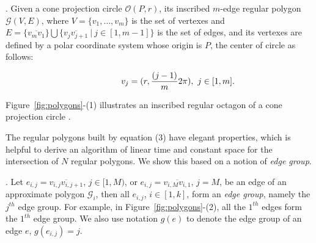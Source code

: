 .
Given a cone projection circle $\mathcal{O}(P, r)$, its inscribed $m$-edge regular polygon $\mathcal{G}(V, E)$,
where $V=\{v_1, \ldots, v_{m}\}$ is the set of vertexes and
$E= \{\overline{v_mv_1}\} \bigcup \{\overline{v_jv_{j+1}}\ |\ j\in [1, m-1]\}$ is the set of edges,
and its vertexes are defined by a polar coordinate system whose  origin is $P$, the center of circle \circle{} as follows:


\vspace{-1ex}
\begin{equation*}
\label{equ-regular-polygon}
    \begin{aligned}
        \hspace{10ex}  v_j = (r, \frac{(j-1)}{m}2\pi), ~j \in [1, m].\\
    \end{aligned}
\end{equation*}
\vspace{-1ex}


Figure~\ref{fig:polygons}-(1) illustrates an inscribed regular octagon of a cone projection  circle .

The regular polygons built by equation (3) have elegant properties, which is helpful to derive an algorithm of linear time and constant space
for the intersection of $N$ regular polygons. We show this based on a notion of \emph{edge group}.


.
Let $e_{i,j} = \overline{v_{i,j}v_{i,j+1}}$, $j\in [1,M)$, or $e_{i,j} = \overline{v_{i,M}v_{i,1}}$, $j = M$, be an edge of an approximate polygon
$\mathcal{G}_i$, then all $e_{i,j}$, $i\in [1, k]$, form an \emph{edge group}, namely the $j^{th}$ edge group.
%
For example, in Figure~\ref{fig:polygons}-(2), all the $1^{th}$ edges form the $1^{th}$ edge group.
%
We also use notation $g(e)$ to denote the edge group of an edge $e$, \ie $g(e_{i,j})=j$.



